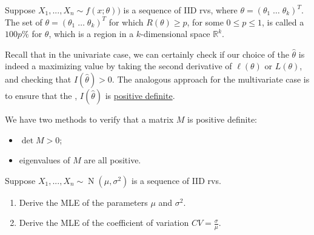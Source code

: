 \documentclass[notoc,notitlepage]{tufte-book}
\DeclareMathOperator{\Nor}{N }
\begin{document}
\begin{defn}
\label{defn:likelihood_region_multivariate}
  Suppose $X_1, ..., X_n \sim f(x; \theta))$ is a sequence of IID rvs, where $\theta = (\theta_1 \; \hdots \; \theta_k)^T$. The set of $\theta = (\theta_1 \; \hdots \; \theta_k)^T$ for which $R(\theta) \geq p$, for some $0 \leq p \leq 1$, is called a $100p\%$  for $\theta$, which is a region in a $k$-dimensional space $\mathbb{R}^k$.
\end{defn}

\begin{note}
  Recall that in the univariate case, we can certainly check if our choice of the $\hat{\theta}$ is indeed a maximizing value by taking the second derivative of $\ell(\theta)$ or $L(\theta)$, and checking that $I(\hat{\theta}) > 0$. The analogous approach for the multivariate case is to ensure that the , $I(\hat{\theta})$ is \href{https://en.wikipedia.org/wiki/Positive-definite_matrix}{positive definite}.

  We have two methods to verify that a matrix $M$ is positive definite:
  \begin{itemize}
    \item $\det M > 0$;
    \item eigenvalues of $M$ are all positive.
  \end{itemize}
\end{note}

\begin{eg}\label{eg:6_12_pt1}
  Suppose $X_1, ..., X_n \sim \Nor\left( \mu, \sigma^2 \right)$ is a sequence of IID rvs.
  \begin{enumerate}
    \item Derive the MLE of the parameters $\mu$ and $\sigma^2$.
    \item Derive the MLE of the coefficient of variation $CV = \frac{\sigma}{\mu}$.
  \end{enumerate}
\end{eg}
\end{document}
